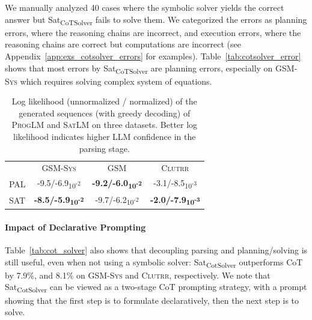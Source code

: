 \documentclass{article}
\theoremstyle{definition}
\newcommand{\gsm}{\textsc{GSM}}
\newcommand{\gsmsys}{\textsc{GSM-Sys}}
\newcommand{\clutrr}{\textsc{Clutrr}}
\newcommand{\satlm}{\textsc{SatLM}}
\newcommand{\pallm}{\textsc{ProgLM}}
\begin{document}
We manually analyzed 40 cases where the symbolic solver yields the correct answer but {\sc Sat\textsubscript{CoTSolver}} fails to solve them. We categorized the errors as planning errors, where the reasoning chains are incorrect, and execution errors, where the reasoning chains are correct but computations are incorrect (see Appendix~\ref{app:exs_cotsolver_errors} for examples). Table~\ref{tab:cotsolver_error} shows that most errors by {\sc Sat\textsubscript{CoTSolver}} are planning errors, %
especially on \gsmsys{} which requires solving complex system of equations. %


\begin{table}
    \caption{Log likelihood (unnormalized / normalized) of the generated sequences (with greedy decoding) of \pallm{} and \satlm{} on three datasets. Better log likelihood indicates higher LLM confidence in the parsing stage.}
    \centering
    \scriptsize
    \begin{tabular}{lccc}
    \toprule
         & \gsmsys{} & \gsm{} & \clutrr{} \\
        \cmidrule{2-4} 
    \sc PAL   & -9.5/-6.9\textsubscript{10\textsuperscript{-2}} & \bf -9.2/-6.0\textsubscript{10\textsuperscript{-2}} & -3.1/-8.5\textsubscript{10\textsuperscript{-3}} \\
    \sc SAT   & \bf -8.5/-5.9\textsubscript{10\textsuperscript{-2}} & -9.7/-6.2\textsubscript{10\textsuperscript{-2}} & \bf-2.0/-7.9\textsubscript{10\textsuperscript{-3}} \\
    \bottomrule
    \end{tabular}
    \label{tab:loglikelihood}
\end{table} 

\paragraph{Impact of Declarative Prompting} Table~\ref{tab:cot_solver} also shows that decoupling parsing and planning/solving is still useful, even when not using a symbolic solver: {\sc Sat\textsubscript{CotSolver}} outperforms {\sc CoT} by 7.9\%, and 8.1\% on \gsmsys{} and \clutrr{}, respectively. We note that {\sc Sat\textsubscript{CotSolver}} can be viewed as a two-stage CoT prompting strategy, with a prompt showing that the first step is to formulate declaratively, then the next step is to solve. %
\end{document}
